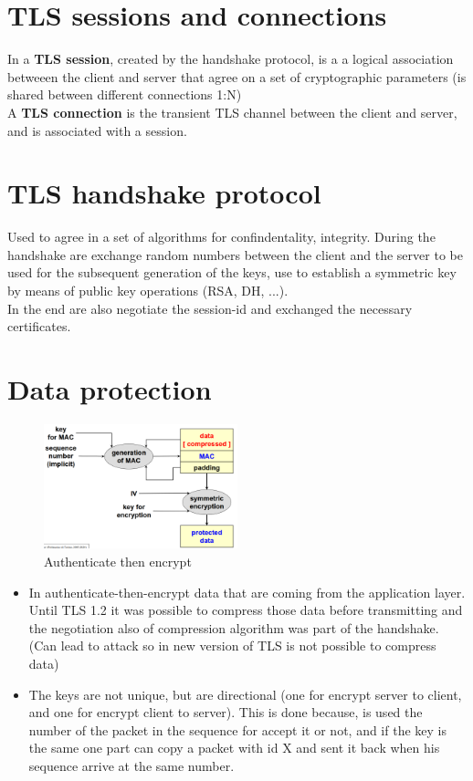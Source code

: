 \section{TLS sessions and connections}

In a \textbf{TLS session}, created by the handshake protocol, is a a logical association betweeen the client and server that agree on a set of cryptographic parameters (is shared between different connections 1:N) \\

A  \textbf{TLS connection} is the transient TLS channel between the client and server, and is associated with a session. \\

\section{TLS handshake protocol}
Used to agree in a set of algorithms for confindentality, integrity. During the handshake are exchange random numbers between the client and the server to be used for the subsequent generation of the keys, use to establish a symmetric key by means of public key operations (RSA, DH, ...). \\ 
In the end are also negotiate the session-id and exchanged the necessary certificates.

\newpage
\section{Data protection}

\begin{figure}[!ht]
    \centering
    \includegraphics[width=0.5\textwidth]{img/data_protection.png}
    \caption{Authenticate then encrypt}
    \label{fig:data_prot}
\end{figure}
\begin{itemize}
    \item In authenticate-then-encrypt data that are coming from the application layer. Until TLS 1.2 it was possible to compress those data before transmitting and the negotiation also of compression algorithm was part of the handshake. (Can lead to attack so in new version of TLS is not possible to compress data)
    \item The keys are not unique, but are directional (one for encrypt server to client, and one for encrypt client to server). This is done because, is used the number of the packet in the sequence for accept it or not, and if the key is the same one part can copy a packet with id X and sent it back when his sequence arrive at the same number. 
\end{itemize}


